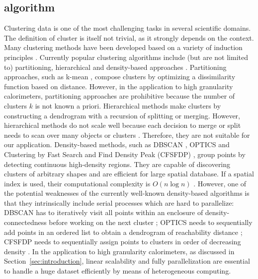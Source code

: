 \subsection{algorithm}
Clustering data is one of the most challenging tasks in several scientific domains. The definition of cluster is itself not trivial, as it strongly depends on the context. Many clustering methods have been developed based on a variety of induction principles \cite{maimon2005data}. Currently popular clustering algorithms include (but are not limited to) partitioning, hierarchical and density-based approaches \cite{maimon2005data,han2011data}. Partitioning approaches, such as k-mean \cite{lloyd1982least}, compose clusters by optimizing a dissimilarity function based on distance. However, in the application to high granularity calorimeters, partitioning approaches are prohibitive because the number of clusters $k$ is not known a priori. Hierarchical methods make clusters by constructing a dendrogram with a recursion of splitting or merging. However, hierarchical methods do not scale well because each decision to merge or split needs to scan over many objects or clusters \cite{han2011data}. Therefore, they are not suitable for our application. Density-based methods, such as DBSCAN \cite{Ester:1996:DAD:3001460.3001507}, OPTICS \cite{Ankerst:1999:OOP:304182.304187} and Clustering by Fast Search and Find Density Peak (CFSFDP) \cite{rodriguez2014clustering}, group points by detecting continuous high-density regions. They are capable of discovering clusters of arbitrary shapes and are efficient for large spatial database. If a spatial index is used, their computational complexity is $O(n\log n)$ \cite{han2011data}. However, one of the potential weaknesses of the currently well-known density-based algorithms is that they intrinsically include serial processes which are hard to parallelize: DBSCAN has to iteratively visit all points within an enclosure of density-connectedness before working on the next cluster \cite{Ester:1996:DAD:3001460.3001507}; OPTICS needs to sequentially add points in an ordered list to obtain a dendrogram of reachability distance \cite{Ankerst:1999:OOP:304182.304187}; CFSFDP needs to sequentially assign points to clusters in order of decreasing density \cite{rodriguez2014clustering}. In the application to high granularity calorimeters, as discussed in Section~\ref{sec:introduction}, linear scalability and fully parallelization are essential to handle a huge dataset efficiently by means of heterogeneous computing.


